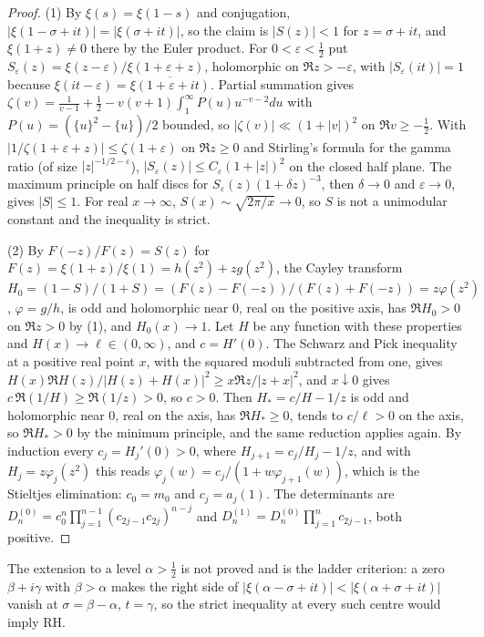 \begin{proof}
(1) By $\xi(s)=\xi(1-s)$ and conjugation, $|\xi(1-\sigma+it)|=|\xi(\sigma+it)|$, so the claim is $|S(z)|<1$ for $z=\sigma+it$, and $\xi(1+z)\ne0$ there by the Euler product. For $0<\varepsilon<\tfrac12$ put $S_\varepsilon(z)=\xi(z-\varepsilon)/\xi(1+\varepsilon+z)$, holomorphic on $\Re z>-\varepsilon$, with $|S_\varepsilon(it)|=1$ because $\xi(it-\varepsilon)=\overline{\xi(1+\varepsilon+it)}$. Partial summation gives $\zeta(v)=\tfrac1{v-1}+\tfrac12-v(v+1)\int_1^\infty P(u)u^{-v-2}du$ with $P(u)=(\{u\}^2-\{u\})/2$ bounded, so $|\zeta(v)|\ll(1+|v|)^2$ on $\Re v\ge-\tfrac12$. With $|1/\zeta(1+\varepsilon+z)|\le\zeta(1+\varepsilon)$ on $\Re z\ge0$ and Stirling's formula for the gamma ratio (of size $|z|^{-1/2-\varepsilon}$), $|S_\varepsilon(z)|\le C_\varepsilon(1+|z|)^2$ on the closed half plane. The maximum principle on half discs for $S_\varepsilon(z)(1+\delta z)^{-3}$, then $\delta\to0$ and $\varepsilon\to0$, gives $|S|\le1$. For real $x\to\infty$, $S(x)\sim\sqrt{2\pi/x}\to0$, so $S$ is not a unimodular constant and the inequality is strict.

(2) By $F(-z)/F(z)=S(z)$ for $F(z)=\xi(1+z)/\xi(1)=h(z^2)+zg(z^2)$, the Cayley transform $H_0=(1-S)/(1+S)=(F(z)-F(-z))/(F(z)+F(-z))=z\varphi(z^2)$, $\varphi=g/h$, is odd and holomorphic near $0$, real on the positive axis, has $\Re H_0>0$ on $\Re z>0$ by (1), and $H_0(x)\to1$. Let $H$ be any function with these properties and $H(x)\to\ell\in(0,\infty)$, and $c=H'(0)$. The Schwarz and Pick inequality at a positive real point $x$, with the squared moduli subtracted from one, gives $H(x)\Re H(z)/|H(z)+H(x)|^2\ge x\Re z/|z+x|^2$, and $x\downarrow0$ gives $c\,\Re(1/H)\ge\Re(1/z)>0$, so $c>0$. Then $H_*=c/H-1/z$ is odd and holomorphic near $0$, real on the axis, has $\Re H_*\ge0$, tends to $c/\ell>0$ on the axis, so $\Re H_*>0$ by the minimum principle, and the same reduction applies again. By induction every $c_j=H_j'(0)>0$, where $H_{j+1}=c_j/H_j-1/z$, and with $H_j=z\varphi_j(z^2)$ this reads $\varphi_j(w)=c_j/(1+w\varphi_{j+1}(w))$, which is the Stieltjes elimination: $c_0=m_0$ and $c_j=a_j(1)$. The determinants are $D_n^{(0)}=c_0^n\prod_{j=1}^{n-1}(c_{2j-1}c_{2j})^{n-j}$ and $D_n^{(1)}=D_n^{(0)}\prod_{j=1}^nc_{2j-1}$, both positive.
\end{proof}

The extension to a level $\alpha>\tfrac12$ is not proved and is the ladder criterion: a zero $\beta+i\gamma$ with $\beta>\alpha$ makes the right side of $|\xi(\alpha-\sigma+it)|<|\xi(\alpha+\sigma+it)|$ vanish at $\sigma=\beta-\alpha$, $t=\gamma$, so the strict inequality at every such centre would imply RH.


